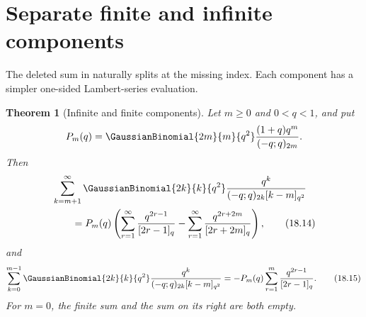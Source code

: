 \documentclass[11pt,a4paper,oneside,openany]{book}
\newtheorem{theorem}{Theorem}[chapter]
\theoremstyle{definition}
\theoremstyle{remark}
\begin{document}
\section{Separate finite and infinite components}

The deleted sum in  naturally splits at the missing
index.  Each component has a simpler one-sided Lambert-series evaluation.

\begin{theorem}[Infinite and finite components]\label{thm:central-components}
Let $m\ge0$ and $0<q<1$, and put
\[
 P_m(q)=\GaussianBinomial{2m}{m}{q^2}
 \frac{(1+q)q^m}{(-q;q)_{2m}}.
\]
Then
\begin{align}
 &\sum_{k=m+1}^{\infty}
 \GaussianBinomial{2k}{k}{q^2}
 \frac{q^k}{(-q;q)_{2k}[k-m]_{q^2}}
 \notag\\
 &\qquad=P_m(q)\left(
 \sum_{r=1}^{\infty}\frac{q^{2r-1}}{[2r-1]_q}
 -\sum_{r=1}^{\infty}\frac{q^{2r+2m}}{[2r+2m]_q}
 \right),
 \tag{18.14}\label{eq:central-infinite-component}
\end{align}
and
\[
 \sum_{k=0}^{m-1}
 \GaussianBinomial{2k}{k}{q^2}
 \frac{q^k}{(-q;q)_{2k}[k-m]_{q^2}}
 =-P_m(q)\sum_{r=1}^{m}\frac{q^{2r-1}}{[2r-1]_q}.
 \tag{18.15}\label{eq:central-finite-component}
\]
For $m=0$, the finite sum and the sum on its right are both empty.
\end{theorem}
\end{document}

